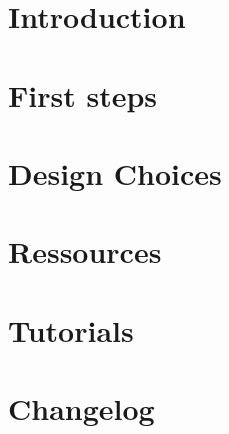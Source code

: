 \documentclass{include/thesisclass}
\begin{document}
    \FrontMatter

    
    

    \begingroup \let\clearpage\relax    %
    \tableofcontents                    %
    \listoffigures
    \listoftables
    \endgroup
    \cleardoublepage
    
    \MainMatter

    \chapter{Introduction}
    
    
    \chapter{First steps}
    
    
    \chapter{Design Choices}
    
    
    \chapter{Ressources}
    
    
	\chapter{Tutorials}
	
	
	
	\chapter*{Changelog}	
		
	
    \Appendix
    \chapter*{\appendixname} 
\end{document}
